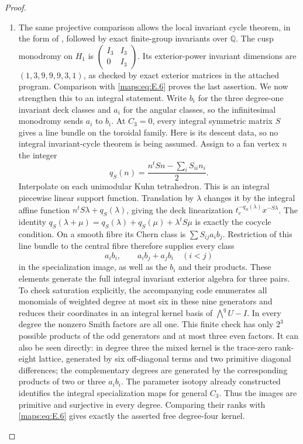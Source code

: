 \begin{proof}
\begin{enumerate}[label=\arabic*.,leftmargin=*]
\item The same projective comparison allows the local invariant cycle
theorem, in the form of \cite[Theorem B]{ffChen}, followed by exact
finite-group invariants over $\mathbb Q$.  The cusp monodromy on
$H_1$ is $\left(\begin{smallmatrix}I_3&I_3\\0&I_3\end{smallmatrix}\right)$.
Its exterior-power invariant dimensions are
$(1,3,9,9,9,3,1)$, as checked by exact exterior matrices in the
attached program.  Comparison with \eqref{maps:eq:E.6} proves the last assertion.
We now strengthen this to an integral statement.  Write $b_i$ for the
three degree-one invariant deck classes and $a_i$ for the angular
classes, so the infinitesimal monodromy sends $a_i$ to $b_i$.
At $C_3=0$, every integral symmetric matrix $S$ gives a line bundle
on the toroidal family.  Here is its descent data, so no integral
invariant-cycle theorem is being assumed.  Assign to a fan vertex $n$
the integer
\[
 q_S(n)=\frac{n^tSn-\sum_iS_{ii}n_i}{2}.
\]
Interpolate on each unimodular Kuhn tetrahedron.  This is an integral
piecewise linear support function.  Translation by $\lambda$ changes
it by the integral affine function
$n^tS\lambda+q_S(\lambda)$, giving the deck linearization
$t_c^{-q_S(\lambda)}x^{-S\lambda}$.
The identity
$q_S(\lambda+\mu)=q_S(\lambda)+q_S(\mu)+\lambda^tS\mu$
is exactly the cocycle condition.  On a smooth fibre its Chern class
is $\sum S_{ij}a_i b_j$.  Restriction of this line bundle to the
central fibre therefore supplies every class
\[
 a_i b_i,\qquad a_i b_j+a_j b_i\quad(i<j)
\]
in the specialization image, as well as the $b_i$ and their products.
These elements generate the full integral invariant exterior algebra
for three pairs.  To check saturation explicitly, the accompanying
code enumerates all monomials of weighted degree at most six in these
nine generators and reduces their coordinates in an integral kernel
basis of $\bigwedge^q U-I$.  In every degree the nonzero Smith factors
are all one.  This finite check has only $2^3$ possible products of
the odd generators and at most three even factors.  It can also be
seen directly: in degree three the mixed kernel is the trace-zero
rank-eight lattice, generated by six off-diagonal terms and two
primitive diagonal differences; the complementary degrees are
generated by the corresponding products of two or three $a_i b_i$.
The parameter isotopy already constructed identifies the integral
specialization maps for general $C_3$.  Thus the images are primitive
and surjective in every degree.  Comparing their ranks with \eqref{maps:eq:E.6}
gives exactly the asserted free degree-four kernel.
\end{enumerate}
\end{proof}

